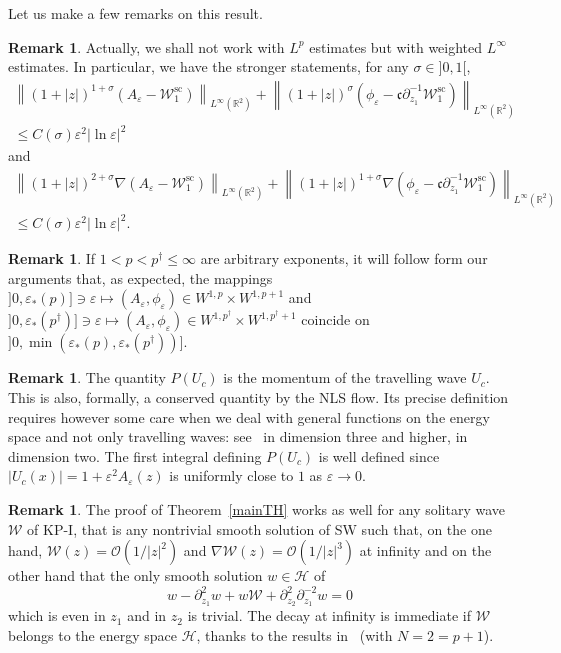 \documentclass[10pt]{amsart}
\theoremstyle{definition}\newtheorem{defi}[theo]{Definition}\newtheorem{rema}[theo]{Remark}\newtheorem{exam}[theo]{Example}\newtheorem{exem}[theo]{Example}\newtheorem{nota}[theo]{Notation}
\newcommand*\p{\partial}
\newcommand*\R{\mathbb R}
\renewcommand{\sc}{\mathrm{sc}}
\newcommand*\BO{\mathcal{O}}
\newcommand*\BH{\mathcal{H}}
\newcommand*\BW{\mathcal{W}}
\newcommand*\cs{{\mathfrak c}}
\newcommand*\ii{\infty}
\newcommand*\ls{\leqslant }
\newcommand*\e{\varepsilon}
\newcommand*\lne{\lvert \ln \varepsilon \rvert}
\newcommand*\s{\sigma}
\begin{document}
Let us make a few remarks on this result.

\begin{rema}
Actually, we shall not work with $L^p $ estimates but with weighted $ L^\ii $ estimates. In particular, we have the stronger statements, for any $\s \in]0,1 [$,
\begin{multline*}
\left\| (1+|z|)^{1+\s} \left(A_\e - \BW_1^{\sc}\right) \right\|_{ L^\ii (\R^2)} + \left\|(1+|z|)^{\s} \left(\phi_\e - \cs \p_{z_1}^{-1} \BW_1^{\sc}\right)\right\|_{ L^\ii (\R^2)}
\\
\ls C (\s) \e^2 \lne^2
\end{multline*}
and
\begin{multline*}
\left\| (1+|z|)^{2+\s} \nabla (A_\e - \BW_1^{\sc}) \right\|_{ L^\ii (\R^2)} + \left\| (1+|z|)^{1+\s} \nabla \left(\phi_\e - \cs \p_{z_1}^{-1} \BW_1^{\sc}\right) \right\|_{ L^\ii (\R^2)}\\
\ls C (\s) \e^2 \lne^2.
\end{multline*}
\end{rema}

\begin{rema}
If $ 1 < p < p^\dag \ls \ii $ are arbitrary exponents, it will follow form our arguments that, as expected, the mappings $] 0, \e_*(p)] \ni \e \mapsto (A_\e, \phi_\e)
\in W^{1,p} \times W^{1,p+1 }$ and $] 0, \e_*(p^\dag)] \ni \e \mapsto (A_\e, \phi_\e) \in W^{1,p^\dag} \times W^{1,p^\dag+1 } $ coincide on $] 0, \min(\e_*(p), \e_*(p^\dag))] $.
\end{rema}

\begin{rema}
The quantity $ P (U_c) $ is the momentum of the travelling wave $ U_c $. This is also, formally, a conserved quantity by the NLS flow. Its precise definition requires however some care when we deal with general functions on the energy space and not only travelling waves: see~\cite{M_exist} in dimension three and higher, \cite{CM1} in dimension two. The first integral defining $ P(U_c) $ is well defined since $ |U_c (x)| = 1 + \e^2 A_\e(z) $ is uniformly close to $1$ as $ \e \to 0 $.
\end{rema}


\begin{rema}
The proof of Theorem~\ref{mainTH} works as well for any solitary wave $ \BW $ of KP-I, that is any nontrivial smooth solution of SW such that, on the one hand, $ \BW (z) = \BO(1/ |z|^2) $ and $ \nabla \BW (z) = \BO(1/ |z|^3) $ at infinity and on the other hand that the only smooth solution $ w \in \BH $ of
\[
w - \p^2_{z_1} w + w \BW + \p_{z_2}^2 \p_{z_1}^{-2} w = 0
\]
which is even in $z_1 $ and in $z_2 $ is trivial. The decay at infinity is immediate if $ \BW $ belongs to the energy space $ \BH $, thanks to the results in~\cite[Theorem~1.11]{Gravos} (with $ N= 2 = p+1 $).
\end{rema}
\end{document}
